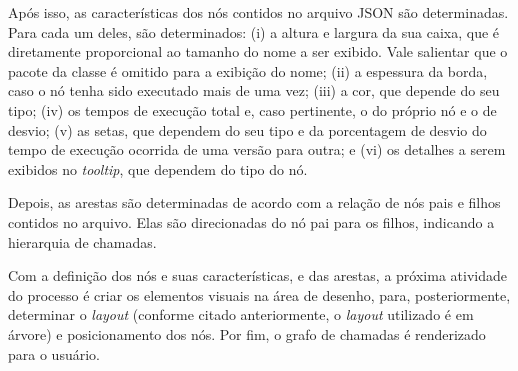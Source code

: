 Após isso, as características dos nós contidos no arquivo JSON são determinadas. Para cada um deles, são determinados: (i) a altura e largura da sua caixa, que é diretamente proporcional ao tamanho do nome a ser exibido. Vale salientar que o pacote da classe é omitido para a exibição do nome; (ii) a espessura da borda, caso o nó tenha sido executado mais de uma vez; (iii) a cor, que depende do seu tipo; (iv) os tempos de execução total e, caso pertinente, o do próprio nó e o de desvio; (v) as setas, que dependem do seu tipo e da porcentagem de desvio do tempo de execução ocorrida de uma versão para outra; e (vi) os detalhes a serem exibidos no \textit{tooltip}, que dependem do tipo do nó.

Depois, as arestas são determinadas de acordo com a relação de nós pais e filhos contidos no arquivo. Elas são direcionadas do nó pai para os filhos, indicando a hierarquia de chamadas.

Com a definição dos nós e suas características, e das arestas, a próxima atividade do processo é criar os elementos visuais na área de desenho, para, posteriormente, determinar o \textit{layout} (conforme citado anteriormente, o \textit{layout} utilizado é em árvore) e posicionamento dos nós. Por fim, o grafo de chamadas é renderizado para o usuário.

